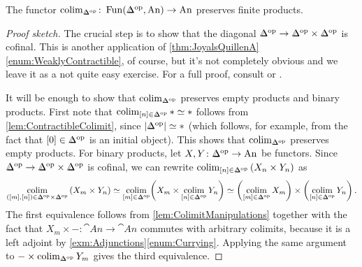 \begin{lem}\label{lem:BPreservesProducts}
	The functor $\colimit_{\IDelta^\op}\colon \Fun(\IDelta^\op,\cat{An})\rightarrow \cat{An}$ preserves finite products.
\end{lem}
\begin{proof}[Proof sketch]
	The crucial step is to show that the diagonal $\IDelta^\op\rightarrow \IDelta^\op\times\IDelta^\op$ is cofinal. This is another application of \cref{thm:JoyalsQuillenA}\cref{enum:WeaklyContractible}, of course, but it's not completely obvious and we leave it as a not quite easy exercise. For a full proof, consult \cite[Tag~\href{https://kerodon.net/tag/02QP}{02QP}]{Kerodon} or \cite[Exercise~\href{https://florianadler.github.io/AlgebraBonn/KTheory.pdf\#smallerdummy.2.18.1}{II.18$a$}]{KTheory}.
	
	It will be enough to show that $\colimit_{\IDelta^\op}$ preserves empty products and binary products. First note that $\colimit_{[n]\in \IDelta^\op}*\simeq *$ follows from \cref{lem:ContractibleColimit}, since  $\left|\IDelta^\op\right|\simeq *$ (which follows, for example, from the fact that $[0]\in\IDelta^\op$ is an initial object). This shows that $\colimit_{\IDelta^\op}$ preserves empty products. For binary products, let $X,Y\colon \IDelta^\op\rightarrow\cat{An}$ be functors. Since $\IDelta^\op\rightarrow\IDelta^\op\times\IDelta^\op$ is cofinal, we can rewrite $\colimit_{[n]\in\IDelta^\op}\left(X_n\times Y_n\right)$ as
	\begin{equation*}
		\colimit_{([m],[n])\in \IDelta^\op\times \IDelta^\op}\left(X_m\times Y_n\right)\simeq \colimit_{[m]\in\IDelta^\op}\biggl(X_m\times \colimit_{[n]\in\IDelta^\op}Y_n\biggr)
		\simeq \biggl(\colimit_{[m]\in\IDelta^\op}X_m\biggr)\times \biggl(\colimit_{[n]\in\IDelta^\op}Y_n\biggr)\,.
	\end{equation*}
	The first equivalence follows from \cref{lem:ColimitManipulations} together with the fact that $X_m\times -\colon \cat{An}\rightarrow\cat{An}$ commutes with arbitrary colimits, because it is a left adjoint by \cref{exm:Adjunctions}\cref{enum:Currying}. Applying the same argument to $-\times \colimit_{\IDelta^\op}Y_m$ gives the third equivalence.
\end{proof}
